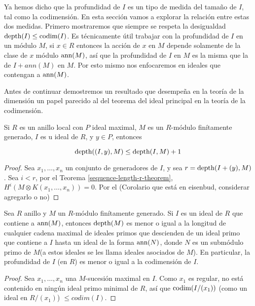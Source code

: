 Ya hemos dicho que la profundidad de $I$ es un tipo de medida del tamaño de $I$, tal como la codimensión. En esta sección vamos a explorar la relación entre estas dos medidas. Primero mostraremos que siempre se respeta la desigualdad $\textrm{depth}(I) \leq \textrm{codim}(I)$. Es técnicamente útil trabajar con la profundidad de $I$ en un módulo $M$, si $x \in R$ entonces la acción de $x$ en $M$ depende solamente de la clase de $x$ módulo $\textrm{ann}(M)$, así que la profundidad de $I$ en $M$ es la misma que la de $I + ann(M)$ en $M$. Por esto mismo nos enfocaremos en ideales que contengan a $\textrm{ann}(M)$.

Antes de continuar demostremos un resultado que desempeña en la teoría de la dimensión un papel parecido al del teorema del ideal principal en la teoría de la codimensión.

\begin{lemma}\label{fixed-depth-localization}
Si $R$ es un anillo local con $P$ ideal maximal, $M$ es un $R$-módulo finítamente generado, $I$ es u ideal de $R$, y $y \in P$, entonces

$$\textrm{depth}((I,y),M) \leq \textrm{depth}(I,M) + 1$$

\end{lemma}

\begin{proof}
Sea $x_1, \dots, x_n$ un conjunto de generadores de $I$, y sea $r = \textrm{depth}(I+(y), M)$. Sea $i<r$, por el Teorema \ref{sequence-length-r-theorem}, $H^i(M\otimes K(x_1,\dots,x_n)) = 0$. Por el (Corolario que está en eisenbud, considerar agregarlo o no)
\end{proof}

\begin{proposition}\label{depth-leq-codimension}
Sea $R$ anillo y $M$ un $R$-módulo finítamente generado. Si $I$ es un ideal de $R$ que contiene a $\textrm{ann}(M)$, entonces $\textrm{depth}(M)$ es menor o igual a la longitud de cualquier cadena maximal de ideales primos que descienden de un ideal primo que contiene a $I$ hasta un ideal de la forma $\textrm{ann}(N)$, donde $N$ es un submódulo primo de $M$(a estos ideales se les llama ideales asociados de $M$). En particular, la profundidad de $I$ (en $R$) es menor o igual a la codimensión de $I$.
\end{proposition}

\begin{proof}
Sea $x_1,\dots,x_n$ una $M$-sucesión maximal en $I$. Como $x_1$ es regular, no está contenido en ningún ideal primo minimal de $R$, así que $\textrm{codim}(I/(x_1))$ (como un ideal en $R/(x_1)$) $\leq codim(I)$.
\end{proof}

